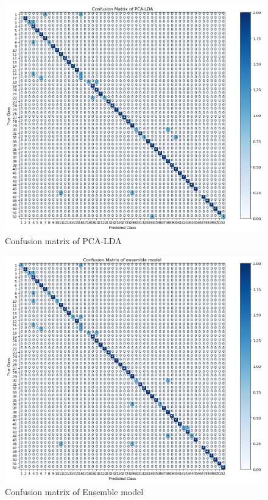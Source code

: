 \begin{figure}
	\centering
	\includegraphics[width=0.8\linewidth]{image/q3_1_cm.png} %
	
	\caption{Confusion matrix of PCA-LDA}
	\label{fig:q3_1_cm}
\end{figure}

\begin{figure}
	\centering
	\includegraphics[width=0.8\linewidth]{image/q3_2_cm.png} %
	
	\caption{Confusion matrix of Ensemble model}
	\label{fig:q3_2_cm}
\end{figure}



